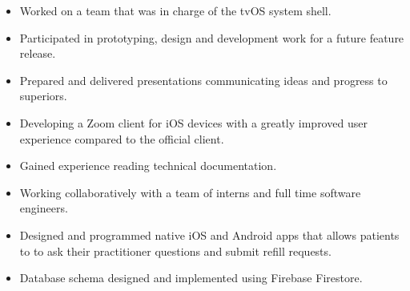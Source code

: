 \documentclass[10pt,letter,ragged2e]{altacv}
\begin{document}


\begin{fullwidth}
\makecvheader
\end{fullwidth}




\begin{itemize}
  \item Worked on a team that was in charge of the tvOS system shell.
  \item Participated in prototyping, design and development work for a future feature release.
  \item Prepared and delivered presentations communicating ideas and progress to superiors.
\end{itemize}

\divider

\begin{itemize}
  \item Developing a Zoom client for iOS devices with a greatly improved user experience compared to the official client.
  \item Gained experience reading technical documentation.
  \item Working collaboratively with a team of interns and full time software engineers.
\end{itemize}

\divider

\begin{itemize}
  \item Designed and programmed native iOS and Android apps that allows patients to to ask their practitioner questions and submit refill requests. 
  \item Database schema designed and implemented using Firebase Firestore.
\end{itemize}
\end{document}
